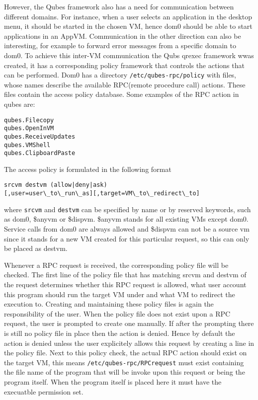 \documentclass[runningheads,a4paper]{article}
\begin{document}
However, the Qubes framework also has a need for communication between
different domains. For instance, when a user selects an application in
the desktop menu, it should be started in the chosen VM, hence dom0
should be able to start applications in an AppVM. Communication in the
other direction can also be interesting, for example to forward error
messages from a specific domain to dom0. To achieve this inter-VM
communication the Qubs qrexec framework wwas created, it has a
corresponding policy framework that controls the actions that can be
performed. Dom0 has a directory \texttt{/etc/qubes-rpc/policy} with
files, whose names describe the available RPC(remote procedure call)
actions. These files contain the access policy database. Some examples
of the RPC action in qubes are:
\begin{verbatim}
qubes.Filecopy
qubes.OpenInVM
qubes.ReceiveUpdates
qubes.VMShell
qubes.ClipboardPaste
\end{verbatim} 
The access policy is formulated in the following format
\begin{verbatim}
srcvm destvm (allow|deny|ask)
[,user=user\_to\_run\_as][,target=VM\_to\_redirect\_to]
\end{verbatim}
where \texttt{srcvm} and \texttt{destvm} can be specified by name or
by reserved keywords, such as dom0, \$anyvm or \$dispvm. \$anyvm
stands for all existing VMs except dom0. Service calls
from dom0 are always allowed and \$dispvm can not be a source vm since
it stands for a new VM created for this particular request, so this
can only be placed as destvm.

Whenever a RPC request is received, the corresponding policy file will
be checked. The first line of the policy file that has matching srcvm
and destvm of the request determines whether this RPC request is
allowed, what user account this program should run the target VM under
and what VM to redirect the execution to. Creating and maintaining
these policy files is again the responsibility of the user. When the
policy file does not exist upon a RPC request, the user is prompted to
create one manually. If after the prompting there is still no policy
file in place then the action is denied. Hence by default the action
is denied unless the user explicitely allows this request by creating
a line in the policy file. Next to this policy check,
the actual RPC action should exist on the target VM, this means
\texttt{/etc/qubes-rpc/RPCrequest} must exist containing the file name
of the program that will be invoke upon this request or being the
program itself. When the program itself is placed here it must have
the execuatble permission set. 
\end{document}
